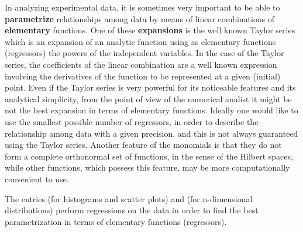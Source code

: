 In analyzing experimental data, it is sometimes very important
to be able
to {\bf parametrize} relationships among data by means of linear
combinations of {\bf elementary} functions. One of these
{\bf expansions} is the well known Taylor series which is an expansion
of an analytic function using as elementary functions (regressors) the
powers of the independent variables.
In the case of the Taylor series, the coefficients of
the linear combination are a well known expression involving the derivatives
of the function to be represented at a given (initial) point.
Even if the Taylor
series is very powerful for its noticeable features and its analytical
simplicity, from the point of view of the numerical analist it might
be not the best expansion in terms of elementary functions.
Ideally one would like to use
the smallest possible number of regressors, in order to describe the
relationship among data with a given precision, and this is not always
guaranteed using the Taylor series.
Another feature of the monomials is that
they do not form a complete orthonormal set of functions, in the sense
of the Hilbert spaces, while other functions, which possess this feature,
may be more computationally convenient to use.
 
The entries  (for histograms and scatter plots) and
 (for n-dimensional distributions) perform regressions on the
data in order to find the best parametrization in terms of elementary functions
(regressors).
 
